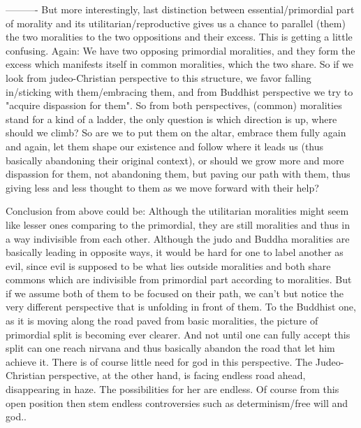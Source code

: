\documentclass{book}
\begin{document}
----------
But more interestingly, last distinction between essential/primordial part of morality and its utilitarian/reproductive gives us a chance to parallel (them) the two moralities to the two oppositions and their excess. This is getting a little confusing. Again: We have two opposing primordial moralities, and they form the excess which manifests itself in common moralities, which the two share. So if we look from judeo-Christian perspective to this structure, we favor falling in/sticking with them/embracing them, and from Buddhist perspective we try to "acquire dispassion for them". So from both perspectives, (common) moralities stand for a kind of a ladder, the only question is which direction is up, where should we climb? So are we to put them on the altar, embrace them fully again and again, let them shape our existence and follow where it leads us (thus basically abandoning their original context), or should we grow more and more dispassion for them, not abandoning them, but paving our path with them, thus giving less and less thought to them as we move forward with their help?   

Conclusion from above could be: Although the utilitarian moralities might seem like lesser ones comparing to the primordial, they are still moralities and thus in a way indivisible from each other. Although the judo and Buddha moralities are basically leading in opposite ways, it would be hard for one to label another as evil, since evil is supposed to be what lies outside moralities and both share commons which are indivisible from primordial part according to moralities. 
But if we assume both of them to be focused on their path, we can't but notice the very different perspective that is unfolding in front of them. To the Buddhist one, as it is moving along the road paved from basic moralities, the picture of primordial split is becoming ever clearer. And not until one can fully accept this split can one reach nirvana and thus basically abandon the road that let him achieve it. There is of course little need for god in this perspective.
The Judeo-Christian perspective, at the other hand, is facing endless road ahead, disappearing in haze. The possibilities for her are endless. Of course from this open position then stem endless controversies such as determinism/free will and god..  
\end{document}

